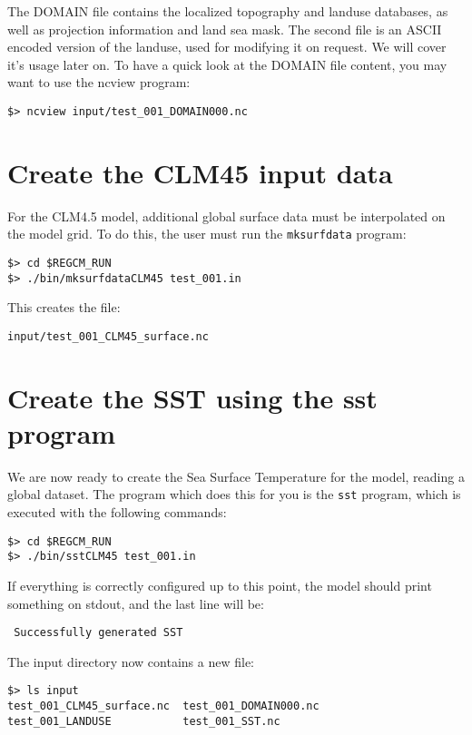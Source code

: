 The DOMAIN file contains the localized topography and landuse databases, as
well as projection information and land sea mask. The second file is an ASCII
encoded version of the landuse, used for modifying it on request. We will cover
it's usage later on.  To have a quick look at the DOMAIN file content, you may
want to use the ncview program:

\begin{Verbatim}
$> ncview input/test_001_DOMAIN000.nc
\end{Verbatim}

\section{Create the CLM45 input data}

For the CLM4.5 model, additional global surface data must be interpolated on
the model grid. To do this, the user must run the \verb=mksurfdata= program:

\begin{Verbatim}
$> cd $REGCM_RUN
$> ./bin/mksurfdataCLM45 test_001.in
\end{Verbatim}

This creates the file:

\begin{Verbatim}
input/test_001_CLM45_surface.nc
\end{Verbatim}

\section{Create the SST using the sst program}

We are now ready to create the Sea Surface Temperature for the model, reading
a global dataset.
The program which does this for you is the \verb=sst= program, which is
executed with the following commands:

\begin{Verbatim}
$> cd $REGCM_RUN
$> ./bin/sstCLM45 test_001.in
\end{Verbatim}

If everything is correctly configured up to this point, the model should print
something on stdout, and the last line will be:

\begin{Verbatim}
 Successfully generated SST
\end{Verbatim}

The input directory now contains a new file:

\begin{Verbatim}
$> ls input
test_001_CLM45_surface.nc  test_001_DOMAIN000.nc
test_001_LANDUSE           test_001_SST.nc
\end{Verbatim}

